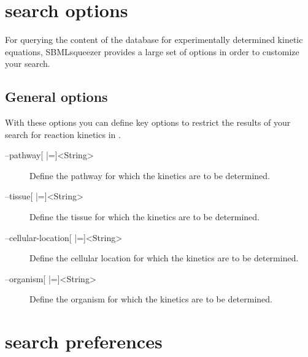 \section{\SABIO search options}
\label{sec:SABIO_search_options}

For querying the content of the \SABIO database for experimentally determined
kinetic equations, SBMLsqueezer provides a large set of options in order to
customize your search.

\subsection{General options}

With these options you can define key options to restrict the results of
your search for reaction kinetics in \SABIO.
\begin{description}
\item[--pathway{[} |={]}<String>]
  Define the pathway for which the kinetics are to be determined.

\item[--tissue{[} |={]}<String>]
  Define the tissue for which the kinetics are to be determined.

\item[--cellular-location{[} |={]}<String>]
  Define the cellular location for which the kinetics are to be
  determined.

\item[--organism{[} |={]}<String>]
  Define the organism for which the kinetics are to be determined.
\end{description}

\section{\SABIO search preferences}
\label{sec:SABIO_search_preferences}

